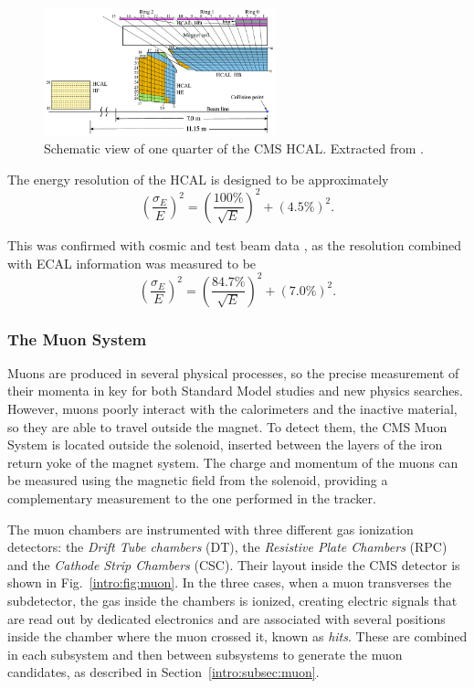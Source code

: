 \documentclass[../main.tex]{subfiles}
\begin{document}
\begin{figure}[h!]
\begin{center}
\includegraphics[width=0.6\textwidth]{Images/hcal}
\end{center}
\caption{Schematic view of one quarter of the CMS HCAL. Extracted from \cite{intro:exp:hcal}.}
\label{intro:fig:hcal}
\end{figure}

The energy resolution of the HCAL is designed to be approximately
\begin{equation}
\left(\frac{\sigma_E}{E}\right)^2 = \left(\frac{100\%}{\sqrt{E}}\right)^2 + (4.5\%)^2.
\end{equation}

This was confirmed with cosmic and test beam data \cite{intro:exp:hcal_res}, as the resolution combined with ECAL information was measured to be
\begin{equation}
\left(\frac{\sigma_E}{E}\right)^2 = \left(\frac{84.7\%}{\sqrt{E}}\right)^2 + (7.0\%)^2.
\end{equation}

\subsubsection{The Muon System}
\label{intro:sec:subdet_muon}

Muons are produced in several physical processes, so the precise measurement of their momenta in key for both Standard Model studies and new physics searches. However, muons poorly interact with the calorimeters and the inactive material, so they are able to travel outside the magnet. To detect them, the CMS Muon System \cite{intro:exp:cms, intro:exp:muon} is located outside the solenoid, inserted between the layers of the iron return yoke of the magnet system. The charge and momentum of the muons can be measured using the magnetic field from the solenoid, providing a complementary measurement to the one performed in the tracker.

The muon chambers are instrumented with three different gas ionization detectors: the \textit{Drift Tube chambers} (DT), the \textit{Resistive Plate Chambers} (RPC) and the \textit{Cathode Strip Chambers} (CSC). Their layout inside the CMS detector is shown in Fig.~\ref{intro:fig:muon}. In the three cases, when a muon transverses the subdetector, the gas inside the chambers is ionized, creating electric signals that are read out by dedicated electronics and are associated with several positions inside the chamber where the muon crossed it, known as \textit{hits}. These are combined in each subsystem and then between subsystems to generate the muon candidates, as described in Section~\ref{intro:subsec:muon}.
\end{document}
